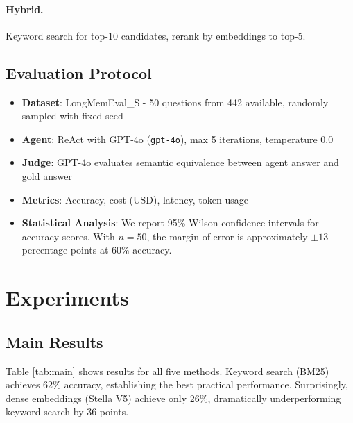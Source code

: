 \documentclass{article}
\begin{document}
\paragraph{Hybrid.} Keyword search for top-10 candidates, rerank by embeddings to top-5.

\subsection{Evaluation Protocol}

\begin{itemize}
    \item \textbf{Dataset}: LongMemEval\_S - 50 questions from 442 available, randomly sampled with fixed seed
    \item \textbf{Agent}: ReAct with GPT-4o (\texttt{gpt-4o}), max 5 iterations, temperature 0.0
    \item \textbf{Judge}: GPT-4o evaluates semantic equivalence between agent answer and gold answer
    \item \textbf{Metrics}: Accuracy, cost (USD), latency, token usage
    \item \textbf{Statistical Analysis}: We report 95\% Wilson confidence intervals for accuracy scores. With $n=50$, the margin of error is approximately $\pm 13$ percentage points at 60\% accuracy.
\end{itemize}

\section{Experiments}
\label{sec:experiments}

\subsection{Main Results}

Table \ref{tab:main} shows results for all five methods. Keyword search (BM25) achieves 62\% accuracy, establishing the best practical performance. Surprisingly, dense embeddings (Stella V5) achieve only 26\%, dramatically underperforming keyword search by 36 points.
\end{document}
